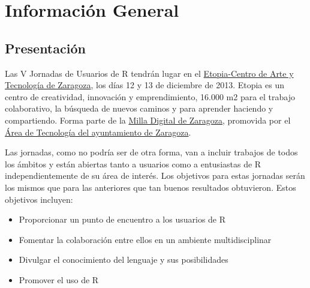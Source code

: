 \part{Información General}

\chapter{Presentación}

Las V Jornadas de Usuarios de R tendrán lugar en el
\href{http://www.zaragoza.es/ciudad/idezar/detalle_Centro?id=5105}{Etopia-Centro
  de Arte y Tecnología de Zaragoza}, los días 12 y 13 de diciembre de
2013. Etopia es un centro de creatividad, innovación y emprendimiento,
16.000 m2 para el trabajo colaborativo, la búsqueda de nuevos caminos
y para aprender haciendo y compartiendo. Forma parte de la
\href{http://www.zaragoza.es/ciudad/sectores/tecnologia/milladigital.htm}{Milla
  Digital de Zaragoza}, promovida por el
\href{http://www.zaragoza.es/ciudad/sectores/tecnologia/}{Área de
  Tecnología del ayuntamiento de Zaragoza}.

Las jornadas, como no podría ser de otra forma, van a incluir trabajos
de todos los ámbitos y están abiertas tanto a usuarios como a
entusiastas de R independientemente de su área de interés. Los
objetivos para estas jornadas serán los mismos que para las anteriores
que tan buenos resultados obtuvieron. Estos objetivos incluyen:

\begin{itemize}
\item Proporcionar un punto de encuentro a los usuarios de R 
\item Fomentar la colaboración entre ellos en un ambiente multidisciplinar 
\item Divulgar el conocimiento del lenguaje y sus posibilidades 
\item Promover el uso de R 
\end{itemize}

